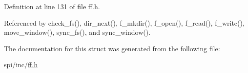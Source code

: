 Definition at line 131 of file ff.\+h.



Referenced by check\+\_\+fs(), dir\+\_\+next(), f\+\_\+mkdir(), f\+\_\+open(), f\+\_\+read(), f\+\_\+write(), move\+\_\+window(), sync\+\_\+fs(), and sync\+\_\+window().



The documentation for this struct was generated from the following file\+:\begin{DoxyCompactItemize}
\item 
spi/inc/\hyperlink{ff_8h}{ff.\+h}\end{DoxyCompactItemize}
